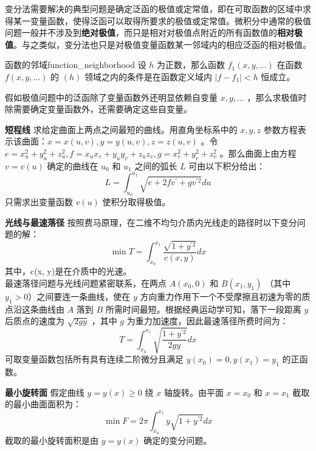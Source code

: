 \documentclass[cn,11pt,chinese,blue,bibstyle=ieeetr]{elegantbook}
\begin{document}
{变分法需要解决的典型问题是确定泛函的极值或定常值，即在可取函数的区域中求得某一变量函数，使得泛函可以取得所要求的极值或定常值。微积分中通常的极值问题一般并不涉及到\textbf{绝对极值}，而只是相对对极值点附近的所有函数值的\textbf{相对极值}。与之类似，变分法也只是对极值变量函数某一邻域内的相应泛函的相对极值。

\begin{definition}{函数的邻域}{function_neighborhood} 
设 $h$ 为正数，那么函数 $f_1(x, y, ...)$ 在函数 $f(x, y, ...)$ 的 $(h)$ 领域之内的条件是在函数定义域内 $|f-f_1| < h$ 恒成立。
\end{definition}

假如极值问题中的泛函除了变量函数外还明显依赖自变量 $x, y, ... $ ，那么求极值时除需要确定变量函数外，还需要确定这些自变量。

\begin{example}
\textbf{短程线} 求给定曲面上两点之间最短的曲线。用直角坐标系中的 $x, y, z$ 参数方程表示该曲面：$x = x(u,v), y = y(u,v), z = z(u,v)$ 。令 $e = x_u^2 + y_u^2 + z_u^2, f = {x_u}{x_v} + {y_u}{y_v} + {z_u}{z_v}, g = x_v^2 + y_v^2 + z_v^2$ 。那么曲面上由方程 $v = v(u)$ 确定的曲线在 $u_0$ 和 $u_1$ 之间的弧长 $L$ 可由以下积分给出：
	\begin{equation}
	L = \int_{u_0}^{u_1} {\sqrt {e + 2fv^{'} + gv^{'2}}}du \nonumber
	\end{equation}
只需求出变量函数 $v(u)$ 使积分取得极值。
\end{example}

\begin{example}
\textbf{光线与最速落径} 按照费马原理，在二维不均匀介质内光线走的路径时以下变分问题的解：
\begin{equation}
\min T = \int_{x_0}^{x_1} {\frac{\sqrt{1 + y^{'2}}}{c(x, y)}} dx \nonumber
\end{equation}
其中，c(x, y)是在介质中的光速。 \\
最速落径问题与光线问题紧密联系，在两点 $A(x_0, 0)$ 和 $B(x_1, y_1)$ （其中 $y_1 > 0$）之间要连一条曲线，使在 $y$ 方向重力作用下一个不受摩擦且初速为零的质点沿这条曲线由 $A$ 落到 $B$ 所需时间最短。根据经典运动学可知，落下一段距离 $y$ 后质点的速度为 $\sqrt{2gy}$ ，其中 $g$ 为重力加速度，因此最速落径所费时间为：
\begin{equation}
T = \int_{x_0}^{x_1} \sqrt{\frac{1 + y^{'2}}{2gy}} dx
\end{equation}
可取变量函数包括所有具有连续二阶微分且满足 $y(x_0) = 0, y(x_1) = y_1$ 的正函数。
\end{example}

\begin{example}
	\textbf{最小旋转面} 假定曲线 $y = y(x) \ge 0$ 绕 $x$ 轴旋转。由平面 $x = x_0$ 和 $x = x_1$ 截取的最小曲面面积为：
	\begin{equation}
		\min F = 2 \pi \int_{x_0}^{x_1} {y \sqrt {1 + y^{'2}}} dx \nonumber
	\end{equation}
截取的最小旋转面积是由 $y = y(x)$ 确定的变分问题。
\end{example}

}
\end{document}
